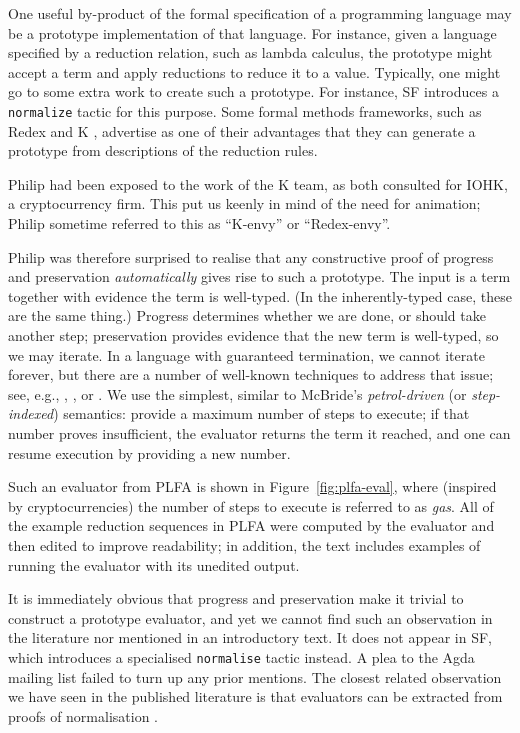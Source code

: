 \documentclass[preprint,authoryear]{elsarticle}
\begin{document}
One useful by-product of the formal specification of a programming
language may be a prototype implementation of that language.  For
instance, given a language specified by a reduction relation, such
as lambda calculus, the prototype might accept a term and apply reductions
to reduce it to a value.  Typically, one might go to some extra work to
create such a prototype.  For instance, SF introduces a \texttt{normalize}
tactic for this purpose.  Some formal methods frameworks, such as
Redex \citep{Felleisen-et-al-2009} and K \citep{Rosu-Serbanuta-2010},
advertise as one of their advantages that they can generate
a prototype from descriptions of the reduction rules.

Philip had been exposed to the work of the K team, as both consulted
for IOHK, a cryptocurrency firm.  This put us keenly in mind of the
need for animation; Philip sometime referred to this as ``K-envy'' or
``Redex-envy''.

Philip was therefore surprised to realise that any constructive proof of
progress and preservation \emph{automatically} gives rise to such a
prototype.  The input is a term together with evidence the term is
well-typed.  (In the inherently-typed case, these are the same thing.)
Progress determines whether we are done, or should take another step;
preservation provides evidence that the new term is well-typed, so we
may iterate. In a language with guaranteed termination, we cannot
iterate forever, but there are a number of well-known techniques to
address that issue; see, e.g., \citet{Bove-and-Capretta-2001},
\citet{Capretta-2005}, or \citet{McBride-2015}.
We use the simplest, similar to McBride's \emph{petrol-driven} (or
\emph{step-indexed}) semantics: provide a maximum number of steps to
execute; if that number proves insufficient, the evaluator returns the
term it reached, and one can resume execution by providing a new
number.

Such an evaluator from PLFA is shown in Figure~\ref{fig:plfa-eval},
where (inspired by cryptocurrencies) the number of steps
to execute is referred to as \emph{gas}. All of the example reduction
sequences in PLFA were computed by the evaluator and then edited to
improve readability; in addition, the text includes examples of
running the evaluator with its unedited output.

It is immediately obvious that progress and preservation make it
trivial to construct a prototype evaluator, and yet we cannot find such
an observation in the literature nor mentioned in an introductory
text.  It does not appear in SF, which introduces a specialised
\texttt{normalise} tactic instead.  A plea
to the Agda mailing list failed to turn up any prior mentions.
The closest related observation we have seen in the published
literature is that evaluators can be extracted from proofs of
normalisation \citep{Berger-1993,Dagand-and-Scherer-2015}.
\end{document}
